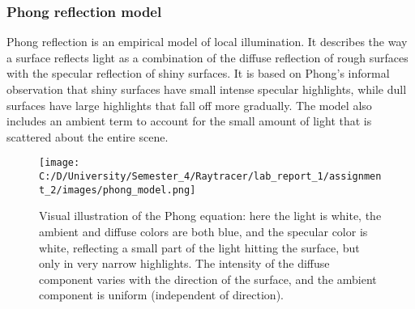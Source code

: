 \documentclass{article}
\begin{document}
\subsubsection{Phong reflection model }
Phong reflection is an empirical model of local illumination. It describes the way a surface reflects light as a combination of the diffuse reflection of rough surfaces with the specular reflection of shiny surfaces. It is based on Phong's informal observation that shiny surfaces have small intense specular highlights, while dull surfaces have large highlights that fall off more gradually. The model also includes an ambient term to account for the small amount of light that is scattered about the entire scene.
\\

	\begin{figure}[h]
	\begin{center}
		\texttt{[image: C:/D/University/Semester\_4/Raytracer/lab\_report\_1/assignment\_2/images/phong\_model.png]}
		
		\caption{Visual illustration of the Phong equation: here the light is white, the ambient and diffuse colors are both blue, and the specular color is white, reflecting a small part of the light hitting the surface, but only in very narrow highlights. The intensity of the diffuse component varies with the direction of the surface, and the ambient component is uniform (independent of direction).}
		\label{fig:boat1}
	\end{center}
\end{figure}
\end{document}
